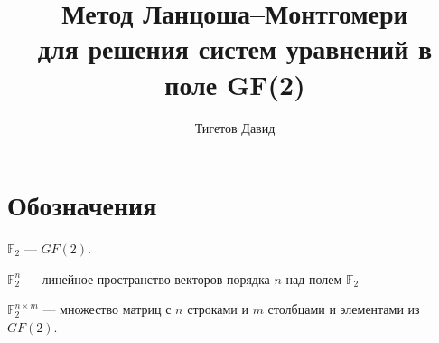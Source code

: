 \documentclass[a4paper,12pt]{report}
\newcommand{\gftwo}{\mathbb{F}_2}
\newcommand{\gftwovector}[1]{\mathbb{F}^{#1}_2}
\newcommand{\gftwomatrix}[2]{\mathbb{F}^{#1 \times #2}_2}
\begin{document}
\title{Метод Ланцоша--Монтгомери \\ для решения систем уравнений в поле GF(2)}
\author{Тигетов Давид}
\maketitle

\tableofcontents

\section*{Обозначения}

$\gftwo$ --- $GF(2)$.

$\gftwovector{n}$ --- линейное пространство векторов порядка $n$ над полем $\gftwo$

$\gftwomatrix{n}{m}$ --- множество матриц с $n$ строками и $m$ столбцами и элементами из $GF(2)$.






\end{document}
